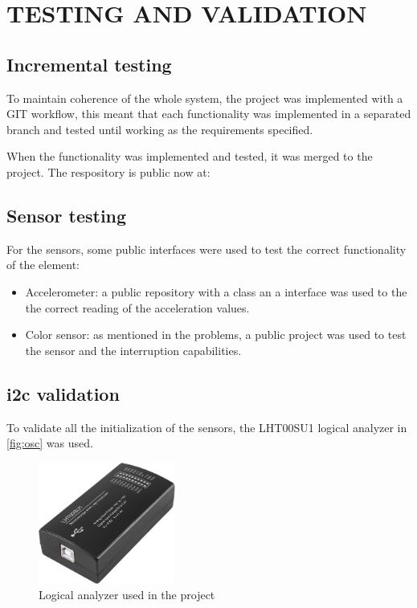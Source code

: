 \section{TESTING AND VALIDATION}
\subsection{Incremental testing}
To maintain coherence of the whole system, the project was implemented with a GIT workflow, this meant that each functionality was implemented in a separated branch and tested until working as the requirements specified.

When the functionality was implemented and tested, it was merged to the project. The respository is public now at:%

\subsection{Sensor testing}

For the sensors, some public interfaces were used to test the correct functionality of the element:
\begin{itemize}
    \item Accelerometer: a public repository\cite{MMA8451driverMMA8451} with a class an a interface was used to the the correct reading of the acceleration values.
    \item Color sensor: as mentioned in the problems, a public project\cite{TCS3472_I2CClasswhich} was used to test the sensor and the interruption capabilities.
\end{itemize}

\subsection{\acrshort{i2c} validation}

To validate all the initialization of the sensors, the LHT00SU1 logical analyzer in \autoref{fig:osc} was used.
\begin{figure}[H]
    \centering
    \includegraphics[width=0.4\textwidth]{images/7/Osc.jpg}
    \caption{Logical analyzer used in the project}
    \label{fig:osc}
\end{figure}

